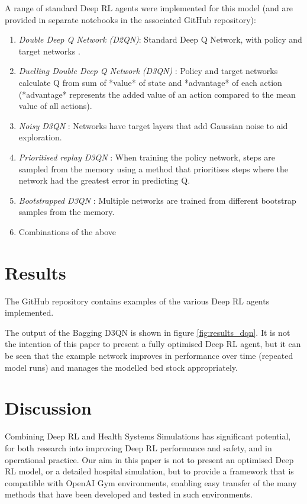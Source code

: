 \documentclass{article}
\begin{document}
\begin{multicols}{2}
A range of standard Deep RL agents were implemented for this model (and are provided in separate notebooks in the associated GitHub repository):

\begin{enumerate}
    \item \emph{Double Deep Q Network (D2QN)}: Standard Deep Q Network, with policy and target networks \cite{van_hasselt_deep_2015}.
    \item \emph{Duelling Double Deep Q Network (D3QN)} \cite{wang_dueling_2016}: Policy and target networks calculate Q from sum of *value* of state and *advantage* of each action (*advantage* represents the added value of an action compared to the mean value of all actions).
    \item \emph{Noisy D3QN} \cite{fortunato_noisy_2019}: Networks have target layers that add Gaussian noise to aid exploration.
    \item \emph{Prioritised replay D3QN} \cite{schaul_prioritized_2016}: When training the policy network, steps are sampled from the memory using a method that prioritises steps where the network had the greatest error in predicting Q.
    \item \emph{Bootstrapped D3QN} \cite{osband_deep_2016}: Multiple networks are trained from different bootstrap samples from the memory.
    \item Combinations of the above
\end{enumerate}

\section{Results}

The GitHub repository contains examples of the various Deep RL agents implemented.

The output of the Bagging D3QN is shown in figure \ref{fig:results_dqn}. It is not the intention of this paper to present a fully optimised Deep RL agent, but it can be seen that the example network improves in performance over time (repeated model runs) and manages the modelled bed stock appropriately.

\section{Discussion}

Combining Deep RL and Health Systems Simulations has significant potential, for both research into improving Deep RL performance and safety, and in operational practice. Our aim in this paper is not to present an optimised Deep RL model, or a detailed hospital simulation, but to provide a framework that is compatible with OpenAI Gym environments, enabling easy transfer of the many methods that have been developed and tested in such environments. 


\end{multicols}
\end{document}
